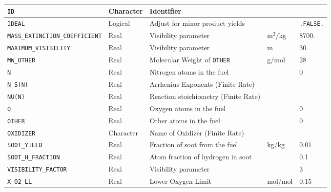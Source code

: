 \documentclass[11pt]{book}
\newcommand{\ct}{\tt\small}
\begin{document}
\begin{table}[H]
\begin{tabular*}{\textwidth}{@{\extracolsep{\fill}}|l|l|l|l|l|}
{\ct ID}                                  & Character   & Identifier                                &                   &     \\ \hline
{\ct IDEAL}                               & Logical     & Adjust for minor product yields           &                   & {\ct .FALSE.}    \\ \hline
{\ct \tiny MASS\_EXTINCTION\_COEFFICIENT} & Real        & Visibility parameter                      &  m$^2$/kg         & 8700.    \\ \hline
{\ct MAXIMUM\_VISIBILITY}                 & Real        & Visibility parameter                      &  m                &     30   \\ \hline
{\ct MW\_OTHER}                           & Real        & Molecular Weight of {\ct OTHER}           &  g/mol            & 28      \\ \hline
{\ct N}                                   & Real        & Nitrogen atoms in the fuel                &                   & 0    \\ \hline
{\ct N\_S(N)}                             & Real        & Arrhenius Exponents (Finite Rate)         &                   &     \\ \hline
{\ct NU(N)}                               & Real        & Reaction stoichiometry (Finite Rate)      &                   &     \\ \hline
{\ct O}                                   & Real        & Oxygen atoms in the fuel                  &                   & 0    \\ \hline
{\ct OTHER}                               & Real        & Other atoms in the fuel                   &                   & 0    \\ \hline
{\ct OXIDIZER}                            & Character   & Name of Oxidizer (Finite Rate)            &                   &         \\ \hline
{\ct SOOT\_YIELD}                         & Real        & Fraction of soot from the fuel            & kg/kg             & 0.01    \\ \hline
{\ct SOOT\_H\_FRACTION}                   & Real        & Atom fraction of hydrogen in soot         &                   & 0.1    \\ \hline
{\ct VISIBILITY\_FACTOR}                  & Real        & Visibility parameter                      &                   &     3   \\ \hline
{\ct X\_O2\_LL}                           & Real        & Lower Oxygen Limit                        &  mol/mol          & 0.15    \\ \hline

\end{tabular*}
\end{table}
\end{document}
